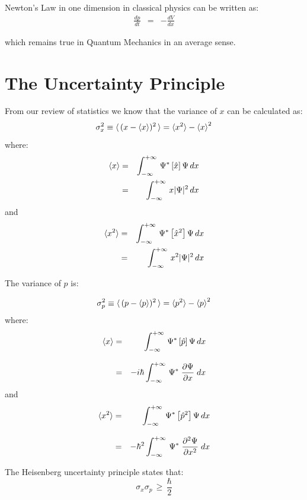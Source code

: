 \documentclass[12pt]{book}
\begin{document}
Newton's Law in one dimension in classical physics can be written as:
\begin{eqnarray}
\label{eqn:ehrenfest}
\frac{dp}{dt} &=& -\frac{dV}{dx}
\end{eqnarray}

which remains true in Quantum Mechanics in an average sense.

\section{The Uncertainty Principle}

From our review of statistics we know that the variance of $x$ can be calculated as:
\begin{displaymath}
\sigma_x^2 \equiv \braket{\,(x-\braket{x})^2\,} = \braket{x^2}-\braket{x}^2
\end{displaymath}
where:
\begin{eqnarray}
\braket{x} 
 &=& \int_{-\infty}^{+\infty} \, \Psi^* \left[ \hat{x} \right] \Psi \,dx \\
 &=& \int_{-\infty}^{+\infty} \, x|\Psi|^2 \,dx 
\end{eqnarray}
and
\begin{eqnarray}
\braket{x^2} 
 &=& \int_{-\infty}^{+\infty} \, \Psi^* \left[ \hat{x}^2 \right] \Psi \,dx \\
 &=& \int_{-\infty}^{+\infty} \, x^2|\Psi|^2 \,dx 
\end{eqnarray}

The variance of $p$ is:

\begin{displaymath}
\sigma_p^2 \equiv \braket{\,(p-\braket{p})^2\,} = \braket{p^2}-\braket{p}^2
\end{displaymath}
where:
\begin{eqnarray}
\braket{x} 
 &=& \int_{-\infty}^{+\infty} \, \Psi^* \left[ \hat{p} \right] \Psi \,dx \\[8pt]
 &=& -i \hbar \int_{-\infty}^{+\infty} \, \Psi^* \;  \frac{\partial \Psi}{\partial x}  \; dx \\
\end{eqnarray}
and
\begin{eqnarray}
\braket{x^2} 
 &=& \int_{-\infty}^{+\infty} \, \Psi^* \left[ \hat{p}^2 \right] \Psi \,dx \\[8pt]
 &=& -\hbar^2 \int_{-\infty}^{+\infty} \, \Psi^* \;  \frac{\partial^2 \Psi}{\partial x^2}  \; dx \\
\end{eqnarray}

The Heisenberg uncertainty principle states that:
\begin{equation}
\sigma_x \sigma_p \, \geq \, \frac{\hbar}{2}
\end{equation}
\end{document}

